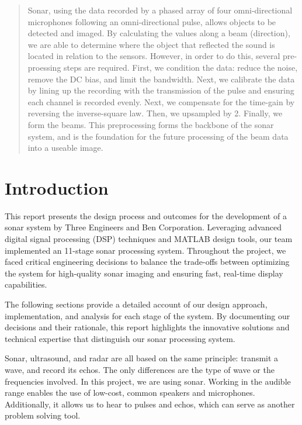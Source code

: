 



\begin{abstract}

Sonar, using the data recorded by a phased array of four omni-directional microphones following an omni-directional pulse, allows objects to be detected and imaged.  By calculating the values along a beam (direction), we are able to determine where the object that reflected the sound is located in relation to the sensors.  However, in order to do this, several pre-proessing steps are required.  First, we condition the data: reduce the noise, remove the DC bias, and limit the bandwidth.  Next, we calibrate the data by lining up the recording with the transmission of the pulse and ensuring each channel is recorded evenly.  Next, we compensate for the time-gain by reversing the inverse-square law.  Then, we upsampled by 2.  Finally, we form the beams.  This preprocessing forms the backbone of the sonar system, and is the foundation for the future processing of the beam data into a useable image.


\end{abstract}

\section{Introduction}

This report presents the design process and outcomes for the development of a sonar system by Three Engineers and Ben Corporation. Leveraging advanced digital signal processing (DSP) techniques and MATLAB design tools, our team implemented an 11-stage sonar processing system. Throughout the project, we faced critical engineering decisions to balance the trade-offs between optimizing the system for high-quality sonar imaging and ensuring fast, real-time display capabilities.

The following sections provide a detailed account of our design approach, implementation, and analysis for each stage of the system. By documenting our decisions and their rationale, this report highlights the innovative solutions and technical expertise that distinguish our sonar processing system.


Sonar, ultrasound, and radar are all based on the same principle: transmit a wave, and record its echos.  The only differences are the type of wave or the frequencies involved.  In this project, we are using sonar.  Working in the audible range enables the use of low-cost, common speakers and microphones.  Additionally, it allows us to hear to pulses and echos, which can serve as another problem solving tool.

